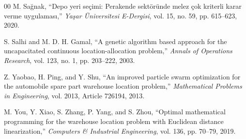 \documentclass[conference]{IEEEtran}
\begin{document}
\begin{thebibliography}{00}
M. Sağnak,
``Depo yeri seçimi: Perakende sektöründe melez çok kriterli karar verme uygulaması,''
\textit{Yaşar Üniversitesi E-Dergisi},
vol. 15, no. 59, pp. 615--623, 2020.
 
S. Salhi and M. D. H. Gamal,
``A genetic algorithm based approach for the uncapacitated continuous location-allocation problem,''
\textit{Annals of Operations Research},
vol. 123, no. 1, pp. 203--222, 2003.
 
Z. Yaobao, H. Ping, and Y. Shu,
``An improved particle swarm optimization for the automobile spare part warehouse location problem,''
\textit{Mathematical Problems in Engineering},
vol. 2013, Article 726194, 2013.
 
M. You, Y. Xiao, S. Zhang, P. Yang, and S. Zhou,
``Optimal mathematical programming for the warehouse location problem with Euclidean distance linearization,''
\textit{Computers \& Industrial Engineering},
vol. 136, pp. 70--79, 2019.
 
\end{thebibliography}
\end{document}
